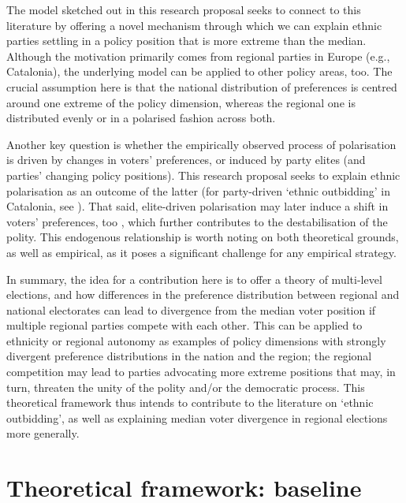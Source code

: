 \documentclass[11pt]{article}
\begin{document}
The model sketched out in this research proposal seeks to connect to this literature by offering a novel mechanism through which we can explain ethnic parties settling in a policy position that is more extreme than the median. Although the motivation primarily comes from regional parties in Europe (e.g., Catalonia), the underlying model can be applied to other policy areas, too. The crucial assumption here is that the national distribution of preferences is centred around one extreme of the policy dimension, whereas the regional one is distributed evenly or in a polarised fashion across both.

Another key question is whether the empirically observed process of polarisation is driven by changes in voters' preferences, or induced by party elites (and parties' changing policy positions). This research proposal seeks to explain ethnic polarisation as an outcome of the latter (for party-driven `ethnic outbidding' in Catalonia, see \textcite{Barrio2017}). That said, elite-driven polarisation may later induce a shift in voters' preferences, too \parencite[p. 291]{Horowitz2000}, which further contributes to the destabilisation of the polity. This endogenous relationship is worth noting on both theoretical grounds, as well as empirical, as it poses a significant challenge for any empirical strategy.

In summary, the idea for a contribution here is to offer a theory of multi-level elections, and how differences in the preference distribution between regional and national electorates can lead to divergence from the median voter position if multiple regional parties compete with each other. This can be applied to ethnicity or regional autonomy as examples of policy dimensions with strongly divergent preference distributions in the nation and the region; the regional competition may lead to parties advocating more extreme positions that may, in turn, threaten the unity of the polity and/or the democratic process. This theoretical framework thus intends to contribute to the literature on `ethnic outbidding', as well as explaining median voter divergence in regional elections more generally.

\section{Theoretical framework: baseline}
\end{document}
